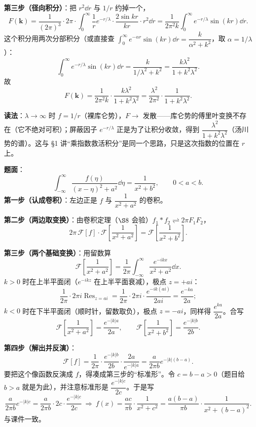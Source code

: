\documentclass[11pt]{ctexart}
\begin{document}
\textbf{第三步（径向积分）}：把 $r^2\dd r$ 与 $1/r$ 约掉一个，
\[
F(\mathbf{k})=\frac{1}{(2\pi)^{3}}\cdot 2\pi\cdot\int_0^{\infty}\frac{1}{r}e^{-r/\lambda}\cdot\frac{2\sin kr}{kr}\cdot r^{2}\dd r
=\frac{1}{2\pi^{2}k}\int_0^{\infty}e^{-r/\lambda}\sin(kr)\dd r .
\]
这个积分用两次分部积分（或直接查 $\int_0^{\infty}e^{-\alpha r}\sin(kr)\dd r=\dfrac{k}{\alpha^{2}+k^{2}}$，取 $\alpha=1/\lambda$）：
\[ \int_0^{\infty}e^{-r/\lambda}\sin(kr)\dd r=\frac{k}{1/\lambda^{2}+k^{2}}=\frac{k\lambda^{2}}{1+k^{2}\lambda^{2}} .\]
故
\[ F(\mathbf{k})=\frac{1}{2\pi^{2}k}\cdot\frac{k\lambda^{2}}{1+k^{2}\lambda^{2}}=\frac{\lambda^{2}}{2\pi^{2}}\cdot\frac{1}{1+k^{2}\lambda^{2}} .\]

\textbf{读法}：$\lambda\to\infty$ 时 $f=1/r$（裸库仑势），$F\to$ 发散——库仑势的傅里叶变换不存在（它不绝对可积）；屏蔽因子 $e^{-r/\lambda}$ 正是为了让积分收敛，得到 $\dfrac{\lambda^{2}}{1+k^{2}\lambda^{2}}$（汤川势的谱）。这与 §1 讲“乘指数救活积分”是同一个思路，只是这次指数的位置在 $r$ 上。


\textbf{题面}：
\[ \int_{-\infty}^{\infty}\frac{f(\eta)}{(x-\eta)^{2}+a^{2}}\dd\eta=\frac{1}{x^{2}+b^{2}},\qquad 0<a<b .\]
\textbf{第一步（认成卷积）}：左边正是 $f$ 与 $\dfrac{1}{x^{2}+a^{2}}$ 的卷积。

\textbf{第二步（两边取变换）}：由卷积定理（$\S8$ 会验）$f_1*f_2\rightleftharpoons2\pi F_1F_2$，
\[ 2\pi\,\mathcal{F}[f]\cdot\mathcal{F}\left[\frac{1}{x^{2}+a^{2}}\right]=\mathcal{F}\left[\frac{1}{x^{2}+b^{2}}\right] .\]

\textbf{第三步（两个基础变换）}：用留数算
\[ \mathcal{F}\left[\frac{1}{x^{2}+a^{2}}\right]=\frac{1}{2\pi}\int_{-\infty}^{\infty}\frac{e^{-ikx}}{x^{2}+a^{2}}\dd x .\]
$k>0$ 时在上半平面闭（$e^{-ikz}$ 在上半平面衰减），极点 $z=+ai$：
\[
\frac{1}{2\pi}\cdot 2\pi i\operatorname{Res}_{z=ai}=\frac{1}{2\pi}\cdot 2\pi i\cdot\frac{e^{-ik(ai)}}{2ai}=\frac{e^{-ka}}{2a} ;
\]
$k<0$ 时在下半平面闭（顺时针，留数取负），极点 $z=-ai$，同样得 $\dfrac{e^{ka}}{2a}$。合写
\[ \mathcal{F}\left[\frac{1}{x^{2}+a^{2}}\right]=\frac{e^{-|k|a}}{2a},\qquad
\mathcal{F}\left[\frac{1}{x^{2}+b^{2}}\right]=\frac{e^{-|k|b}}{2b} .\]

\textbf{第四步（解出并反演）}：
\[
\mathcal{F}[f]=\frac{1}{2\pi}\cdot\frac{e^{-|k|b}}{2b}\cdot\frac{2a}{e^{-|k|a}}=\frac{a}{2\pi b}e^{-|k|(b-a)} .
\]
要把这个像函数反演成 $f$，得凑成第三步的“标准形”。令 $c=b-a>0$（题目给 $b>a$ 就是为此），并注意标准形是 $\dfrac{e^{-|k|c}}{2c}$。于是写
\[
\frac{a}{2\pi b}e^{-|k|c}=\frac{a}{2\pi b}\cdot 2c\cdot\frac{e^{-|k|c}}{2c}
\ \Longrightarrow\ 
f(x)=\frac{ac}{\pi b}\cdot\frac{1}{x^{2}+c^{2}}=\frac{a(b-a)}{\pi b}\cdot\frac{1}{x^{2}+(b-a)^{2}} .
\]
与课件一致。
\end{document}
